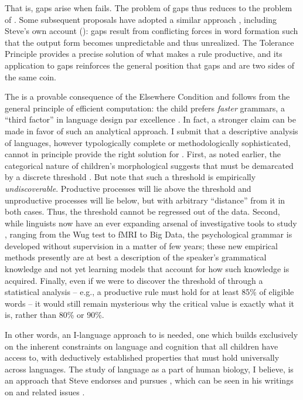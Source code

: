 \documentclass[output=paper,
modfonts
]{LSP/langsci}
\begin{document}
That is, gaps arise when  fails. The problem of gaps thus
reduces to the problem of . 
Some subsequent proposals have adopted
a similar approach \citep{Albright2009b, Baronian2005, Hudson2000,
  Maiden2010, Pullum1977, Sims2006}, including Steve's own account
(\citeyear{Anderson2010b}): gaps  result from conflicting
 forces in word formation such that the
output form becomes unpredictable and thus unrealized. The Tolerance
Principle provides a precise solution of what makes a rule
productive, and its application to gaps reinforces the general
position  that gaps and  are two sides of the same coin.

The  is a provable  consequence of the
Elsewhere Condition and follows from the general principle of efficient
computation: the child prefers \textit{faster} grammars, a ``third
factor'' in  language design par excellence \citep{Chomsky2005}.   In
fact, a stronger 
claim can be made in favor of such an analytical approach. I  submit
that a descriptive analysis of languages, however 
 typologically complete or methodologically  sophisticated, cannot 
in principle provide the right solution for .  First, as
noted earlier, the categorical nature of children's morphological
 suggests that  must be demarcated by a discrete
threshold \citep[see also][36]{Aronoff1976}. But note that such  a
threshold is  empirically \textit{undiscoverable}. Productive 
 processes will  lie above the threshold and
unproductive processes will lie below, but with arbitrary ``distance''
from it in both cases. Thus, the threshold 
cannot be regressed out of the data. Second, while linguists now have
an ever expanding arsenal of investigative tools to study
, ranging from the Wug test to fMRI to Big Data, the
psychological grammar is developed without supervision in a matter of
few years; these new
empirical methods presently are at best a description of the speaker's
grammatical knowledge and not yet learning models that account for how such knowledge is acquired. 
 Finally, even if
we were to discover the threshold of  through a
statistical analysis -- e.g., a productive
rule must hold for at least 85\% of eligible words -- it would
still remain mysterious why the critical value is exactly what it is,
rather than 80\% or 90\%.   

In other words, an I-language approach to  is needed, one
which builds exclusively on the inherent constraints on language and
cognition that all  children have access to, with deductively
established properties that  must hold universally across languages.  
The study of language as a part of human biology, I believe,
is an approach that Steve endorses and pursues  \citep{Anderson2002}, which
can be seen in his writings on   and related issues 
\citep{Anderson2010Ex, Anderson2015}.  
\end{document}
